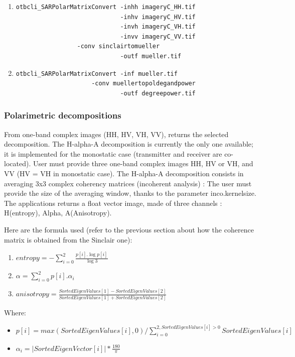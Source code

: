 \begin{enumerate}
									  
\item 
\begin{verbatim} 
otbcli_SARPolarMatrixConvert -inhh imageryC_HH.tif 
                             -inhv imageryC_HV.tif 
                             -invh imageryC_VH.tif 
                             -invv imageryC_VV.tif 
			     -conv sinclairtomueller
                             -outf mueller.tif 
\end{verbatim}
									  
\item 
\begin{verbatim} 
otbcli_SARPolarMatrixConvert -inf mueller.tif 
		             -conv muellertopoldegandpower
                             -outf degreepower.tif 
\end{verbatim}
									  
\end{enumerate}

\subsubsection{Polarimetric decompositions}

From one-band complex images (HH, HV, VH, VV), returns the selected
decomposition.  The H-alpha-A decomposition is currently the only one available;
it is implemented for the monostatic case (transmitter and receiver are
co-located).  User must provide three one-band complex images HH, HV or VH, and
VV (HV = VH in monostatic case).  The H-alpha-A decomposition consists in
averaging 3x3 complex coherency matrices (incoherent analysis) : The user must
provide the size of the averaging window, thanks to the parameter
inco.kernelsize.  The applications returns a float vector image, made of three
channels : H(entropy), Alpha, A(Anisotropy).

Here are the formula used (refer to the previous section about how the coherence
matrix is obtained from the Sinclair one):
\begin{enumerate}
\renewcommand{\labelenumii}{Channel \arabic{enumii} : }
\item $ entropy = -\sum_{i=0}^{2} \frac{p[i].\log{p[i]}}{\log{3}} $
\item $ \alpha = \sum_{i=0}^{2} p[i].\alpha_{i} $
\item $ anisotropy = \frac {SortedEigenValues[1] - SortedEigenValues[2]}{SortedEigenValues[1] + SortedEigenValues[2]} $
\end{enumerate}

Where:
\begin{itemize}
\item $ p[i] = max(SortedEigenValues[i], 0) / \sum_{i=0}^{2, SortedEigenValues[i]>0} SortedEigenValues[i] $
\item $ \alpha_{i} = \left| SortedEigenVector[i] \right|* \frac{180}{\pi}$
\end{itemize}


